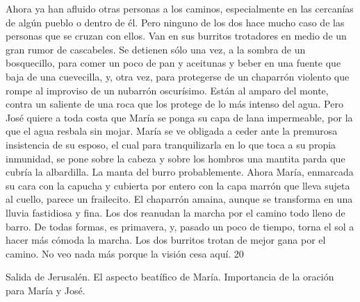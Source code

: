 \documentclass[12pt]{book} %
\begin{document}
Ahora ya han afluido otras personas a los caminos, especialmente en las cercanías de algún pueblo o dentro de él. Pero ninguno de los dos hace mucho caso de las personas que se cruzan con ellos. Van en sus burritos trotadores en medio de un gran rumor de cascabeles. Se detienen sólo una vez, a la sombra de un bosquecillo, para comer un poco de pan y aceitunas y beber en una fuente que baja de una cuevecilla, y, otra vez, para protegerse de un chaparrón violento que rompe al improviso de un nubarrón oscurísimo. 
Están al amparo del monte, contra un saliente de una roca que los protege de lo más intenso del agua. Pero José quiere 
a toda costa que María se ponga su capa de lana impermeable, por la que el agua resbala sin mojar. María se ve obligada a ceder ante la premurosa insistencia de su esposo, el cual para tranquilizarla en lo que toca a su propia inmunidad, se pone sobre la cabeza y sobre los hombros una mantita parda que cubría la albardilla. La manta del burro probablemente. Ahora María, enmarcada su cara con la capucha y cubierta por entero con la capa marrón que lleva sujeta al cuello, parece un frailecito. 
El chaparrón amaina, aunque se transforma en una lluvia fastidiosa y fina. Los dos reanudan la marcha por el camino todo lleno de barro. De todas formas, es primavera, y, pasado un poco de tiempo, torna el sol a hacer más cómoda la marcha. 
Los dos burritos trotan de mejor gana por el camino. 
No veo nada más porque la visión cesa aquí. 
20 
 
Salida de Jerusalén. El aspecto beatífico de María. Importancia de la oración para María y José. 
 
\end{document}
